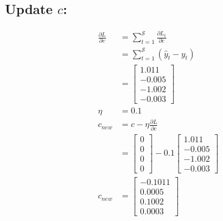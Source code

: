 \documentclass{article}
\begin{document}
\subsection{Update $c$:}
\begin{align*}
\frac{\partial L}{\partial c} &= \sum_{t=1}^{\mathcal{S}} \frac{\partial L_t}{\partial c} \\
 &=\sum_{t=1}^{\mathcal{S}} (\hat{y}_{t} - y_{t})\\
 &=\begin{bmatrix}
 1.011 \\
-0.005 \\
-1.002 \\
-0.003
\end{bmatrix} \\
\eta &= 0.1\\
c_{new} &= c - \eta \frac{\partial L}{\partial c}\\
 &= \begin{bmatrix}
    0 \\
    0 \\
    0 \\
    0
\end{bmatrix} - 0.1 \begin{bmatrix}
 1.011 \\
-0.005 \\
-1.002 \\
-0.003
\end{bmatrix} \\
c_{new} &= \begin{bmatrix}
-0.1011 \\
0.0005 \\
0.1002 \\
0.0003
\end{bmatrix}
\end{align*}
\end{document}
